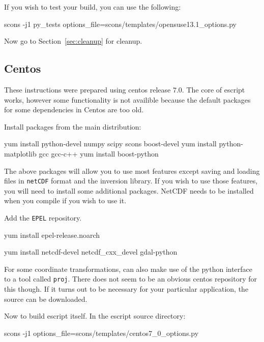 \noindent If you wish to test your build, you can use the following:
\begin{shellCode}
scons -j1 py_tests options_file=scons/templates/opensuse13.1_options.py 
\end{shellCode}

\noindent Now go to Section~\ref{sec:cleanup} for cleanup.

\subsection{Centos}\label{sec:centossrc}
These instructions were prepared using centos release $7.0$.
The core of escript works, however some functionality is not availible because the default packages for some dependencies in Centos are too old.

\noindent Install packages from the main distribution:
\begin{shellCode}
yum install python-devel numpy scipy scons boost-devel
yum install python-matplotlib gcc gcc-c++
yum install boost-python 
\end{shellCode}

The above packages will allow you to use most features except saving and loading files in \texttt{netCDF} 
format and the \downunder inversion library.
If you wish to use those features, you will need to install some additional packages.
NetCDF needs to be installed when you compile if you wish to use it.
\begin{optionalstep}
\noindent Add the \texttt{EPEL} repository.
\begin{shellCode}
yum install epel-release.noarch
\end{shellCode}

\begin{shellCode}
yum install netcdf-devel netcdf_cxx_devel gdal-python
\end{shellCode}
\end{optionalstep}

\noindent For some coordinate transformations, \downunder can also make use of the python interface to a tool called \texttt{proj}.
There does not seem to be an obvious centos repository for this though.
If it turns out to be necessary for your particular application, the source can be downloaded. 

\noindent Now to build escript itself.
In the escript source directory:
\begin{shellCode}
scons -j1 options_file=scons/templates/centos7_0_options.py
\end{shellCode}


